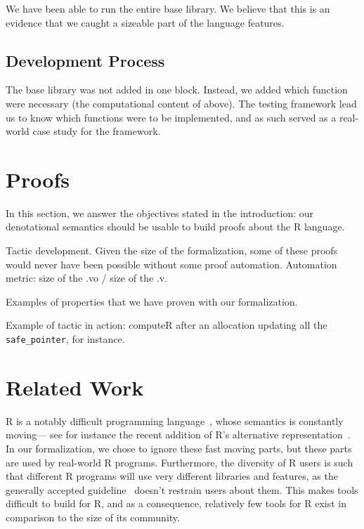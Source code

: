 \documentclass[
    sigplan,
    10pt,
    review, %
    natbib=false %
 ]{acmart}
\begin{document}
We have been able to run the entire base library.
We believe that this is an evidence that we caught a sizeable
part of the language features.

\subsection{Development Process}
\label{sec:library:development}

\todo{}

The base library was not added in one block.
Instead, we added which function were necessary
(the computational content of above).
The testing framework lead us to know which functions were to be implemented,
and as such served as a real-world case study for the framework.


\section{Proofs}
\label{sec:proofs}

In this section,
we answer the objectives stated in the introduction:
our denotational semantics should be usable to build proofs about the R language.

\todo{}

Tactic development.
Given the size of the formalization, some of these proofs would never have been possible
without some proof automation.
Automation metric: size of the .vo / size of the .v.

Examples of properties that we have proven with our formalization.

Example of tactic in action:
computeR after an allocation updating all the \texttt{safe_pointer}, for instance.

\section{Related Work}
\label{sec:related:work}

R is a notably difficult programming language~\parencite{RInferno},
whose semantics is constantly moving---%
see for instance the recent addition
of R's alternative representation~\parencite{altrepR}.
In our formalization, we chose to ignore these fast moving parts,
but these parts are used by real-world R programs.
Furthermore, the diversity of R users is such that different R programs
will use very different libraries and features,
as the generally accepted guideline~\parencite{RGuidelines}
doesn't restrain users about them.
This makes tools difficult to build for R,
and as a consequence, relatively few tools for R exist
in comparison to the size of its community.
\end{document}
